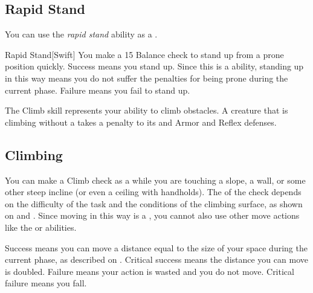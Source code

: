     \subsection{Rapid Stand}\label{Rapid Stand}
        You can use the \textit{rapid stand} ability as a .
        \begin{freeability}{Rapid Stand}[Swift]
            You make a  15 Balance check to stand up from a prone position quickly.
            Success means you stand up.
            Since this is a  ability, standing up in this way means you do not suffer the penalties for being prone during the current phase.
            Failure means you fail to stand up.
        \end{freeability}


\newpage
{}
    The Climb skill represents your ability to climb obstacles.
    A creature that is climbing without a  takes a  penalty to its  and Armor and Reflex defenses.

    \subsection{Climbing}
        You can make a Climb check as a  while you are touching a slope, a wall, or some other steep incline (or even a ceiling with handholds).
        The  of the check depends on the difficulty of the task and the conditions of the climbing surface, as shown on  and .
        Since moving in this way is a , you cannot also use other move actions like the  or  abilities.

        Success means you can move a distance equal to the size of your space during the current phase, as described on .
        Critical success means the distance you can move is doubled.
        Failure means your action is wasted and you do not move.
        Critical failure means you fall.

